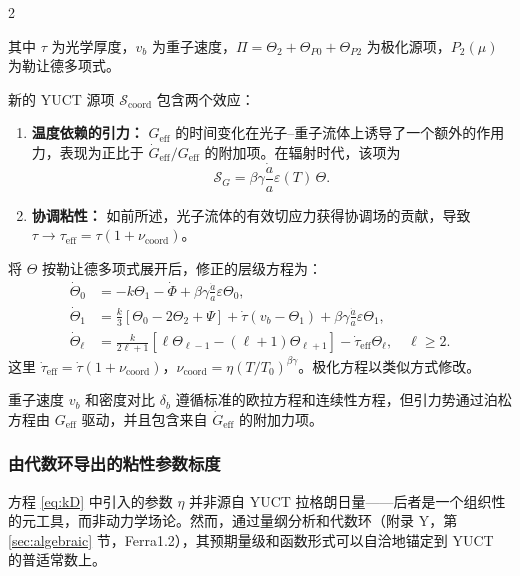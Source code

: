 \documentclass[11pt,a4paper]{article}
\begin{document}
	\begin{multicols}{2}
		
		\noindent 其中 $\tau$ 为光学厚度，$v_b$ 为重子速度，$\Pi = \Theta_2 + \Theta_{P0} + \Theta_{P2}$ 为极化源项，$P_2(\mu)$ 为勒让德多项式。
		
		新的 YUCT 源项 $\mathcal{S}_{\mathrm{coord}}$ 包含两个效应：
		\begin{enumerate}
			\item \textbf{温度依赖的引力：} $G_{\mathrm{eff}}$ 的时间变化在光子–重子流体上诱导了一个额外的作用力，表现为正比于 $\dot{G}_{\mathrm{eff}}/G_{\mathrm{eff}}$ 的附加项。在辐射时代，该项为
			\begin{equation}
				\mathcal{S}_G = \beta\gamma \frac{\dot{a}}{a} \varepsilon(T) \, \Theta.
			\end{equation}
			\item \textbf{协调粘性：} 如前所述，光子流体的有效切应力获得协调场的贡献，导致 $\tau \to \tau_{\mathrm{eff}} = \tau (1 + \nu_{\mathrm{coord}})$。
		\end{enumerate}
		
		将 $\Theta$ 按勒让德多项式展开后，修正的层级方程为：
		\begin{align}
			\dot{\Theta}_0 &= -k\Theta_1 - \dot{\Phi} + \beta\gamma \frac{\dot{a}}{a} \varepsilon \Theta_0, \label{eq:hier0}\\
			\dot{\Theta}_1 &= \frac{k}{3}\left[\Theta_0 - 2\Theta_2 + \Psi\right] + \dot{\tau}(v_b - \Theta_1) + \beta\gamma \frac{\dot{a}}{a} \varepsilon \Theta_1, \label{eq:hier1}\\
			\dot{\Theta}_\ell &= \frac{k}{2\ell+1}\left[\ell\Theta_{\ell-1} - (\ell+1)\Theta_{\ell+1}\right] - \dot{\tau}_{\mathrm{eff}}\Theta_\ell, \quad \ell \ge 2. \label{eq:hier_ell}
		\end{align}
		这里 $\dot{\tau}_{\mathrm{eff}} = \dot{\tau}(1 + \nu_{\mathrm{coord}})$，$\nu_{\mathrm{coord}} = \eta (T/T_0)^{\beta\gamma}$。极化方程以类似方式修改。
		
		重子速度 $v_b$ 和密度对比 $\delta_b$ 遵循标准的欧拉方程和连续性方程，但引力势通过泊松方程由 $G_{\mathrm{eff}}$ 驱动，并且包含来自 $\dot{G}_{\mathrm{eff}}$ 的附加力项。
		
		\subsubsection{由代数环导出的粘性参数标度}
		\label{subsubsec:viscosity_scaling}
		
		方程 \eqref{eq:kD} 中引入的参数 $\eta$ 并非源自 YUCT 拉格朗日量——后者是一个组织性的元工具，而非动力学场论。然而，通过量纲分析和代数环（附录 Y，第 \ref{sec:algebraic} 节，Ferra1.2），其预期量级和函数形式可以自洽地锚定到 YUCT 的普适常数上。
		

\end{multicols}
\end{document}
